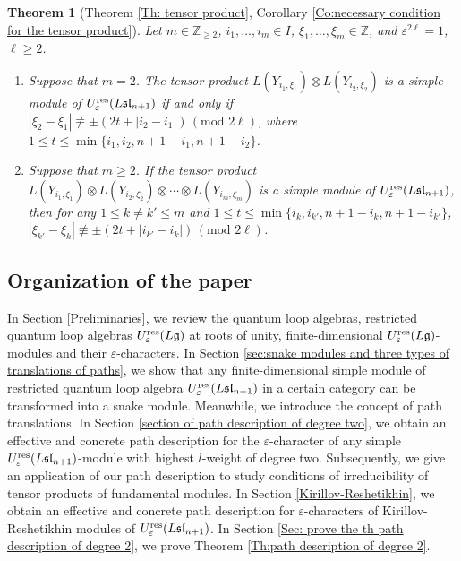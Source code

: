\documentclass[12pt, reqno]{amsart}
\newtheorem{theorem}{Theorem}[section]
\numberwithin{equation}{section}
\newcommand{\res}{{\rm res}}
\begin{document}
\begin{theorem}[Theorem \ref{Th: tensor product}, Corollary \ref{Co:necessary condition for the tensor product}]
Let $m\in \mathbb{Z}_{\geq 2}$, $i_{1},\ldots, i_{m}\in I$, $\xi_{1},\ldots, \xi_{m}\in \mathbb{Z}$, and $\varepsilon^{2 \ell}=1$, $\ell \ge 2$.
\begin{enumerate}
    \item Suppose that $m=2$. The tensor product $L(Y_{i_1,\xi_1})\otimes L(Y_{i_2,\xi_2})$ is a simple module of $U_{\varepsilon}^{\res}(L\mathfrak{sl}_{n+1})$ if and only if $|\xi_{2}-\xi_1 | \not\equiv \pm(2t+|i_2-i_1|)\,(\text{mod } 2 \ell)$, where $1\leq t\leq \min\{i_1, i_2, n+1-i_1, n+1-i_2\}$.
    \item Suppose that $m \geq 2$. If the tensor product
$L(Y_{i_1,\xi_1})\otimes L(Y_{i_2,\xi_2})\otimes \cdots \otimes L(Y_{i_m,\xi_m})$ is a simple module of $U_{\varepsilon}^{\res}(L\mathfrak{sl}_{n+1})$,
then for any $1\leq k\neq k'\leq m$ and $1\leq t\leq \min\{i_k, i_{k'}, n+1-i_k, n+1-i_{k'}\}$, $| \xi_{k'}-\xi_{k} | \not\equiv \pm(2t+|i_{k'}-i_k|)\, (\text{mod } 2 \ell)$.
\end{enumerate}
\end{theorem}

\subsection{Organization of the paper}
In Section \ref{Preliminaries}, we review the quantum loop algebras, restricted quantum loop algebras $U_\varepsilon^{\res}({L\mathfrak{g}})$ at roots of unity, finite-dimensional $U_\varepsilon^{\res}({L\mathfrak{g}})$-modules and their $\varepsilon$-characters. In Section \ref{sec:snake modules and three types of translations of paths}, we show that any finite-dimensional simple module of restricted quantum loop algebra $U_{\varepsilon}^{\res}({L\mathfrak{sl}_{n+1}})$ in a certain category can be transformed into a snake module. Meanwhile, we introduce the concept of path translations. In Section \ref{section of path description of degree two}, we obtain an effective and concrete path description for the $\varepsilon$-character of any simple $U_\varepsilon^{\res}({L\mathfrak{sl}_{n+1}})$-module with highest $l$-weight of degree two. Subsequently, we give an application of our path description to study conditions of irreducibility of tensor products of fundamental modules. In Section \ref{Kirillov-Reshetikhin}, we obtain an effective and concrete path description for $\varepsilon$-characters of Kirillov-Reshetikhin modules of $U_\varepsilon^{\res}({L\mathfrak{sl}_{n+1}})$. In Section \ref{Sec: prove the th path description of degree 2}, we prove Theorem \ref{Th:path description of degree 2}.
\end{document}
